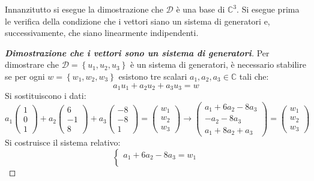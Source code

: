 \documentclass[a4paper]{article}
\begin{document}
	\noindent
	Innanzitutto si esegue la dimostrazione che $\mathscr{D}$ è una base di $\mathbb{C}^{3}$. Si esegue prima le verifica della condizione che i vettori siano un sistema di generatori e, successivamente, che siano linearmente indipendenti.
	
	\begin{proof}[\textbf{Dimostrazione che i vettori sono un sistema di generatori}]
		Per dimostrare che $\mathscr{D} = \left\{u_{1}, u_{2}, u_{3}\right\}$ è un sistema di generatori, è necessario stabilire se per ogni $w = \left\{w_{1}, w_{2}, w_{3}\right\}$ esistono tre scalari $a_{1}, a_{2}, a_{3} \in \mathbb{C}$ tali che:
		\begin{equation*}
			a_{1}u_{1} + a_{2}u_{2} + a_{3}u_{3} = w
		\end{equation*}
		Si sostituiscono i dati:
		\begin{equation*}
			a_{1}\begin{pmatrix}
				1 \\ 0 \\ 1
			\end{pmatrix} +
			a_{2}\begin{pmatrix}
				6 \\ -1 \\ 8
			\end{pmatrix} +
			a_{3}\begin{pmatrix}
				-8 \\ -8 \\ 1
			\end{pmatrix} =
			\begin{pmatrix}
				w_{1} \\ w_{2} \\ w_{3}
			\end{pmatrix} \longrightarrow
			\begin{pmatrix}
				a_{1} + 6a_{2} - 8a_{3} \\
				-a_{2} - 8a_{3} \\
				a_{1} + 8a_{2} + a_{3}
			\end{pmatrix} =
			\begin{pmatrix}
				w_{1} \\ w_{2} \\ w_{3}
			\end{pmatrix}
		\end{equation*}
		Si costruisce il sistema relativo:
		\begin{equation*}
			\begin{cases}
				a_{1} + 6a_{2} - 8a_{3} = w_{1} \\

\end{cases}
\end{equation*}
\end{proof}
\end{document}
